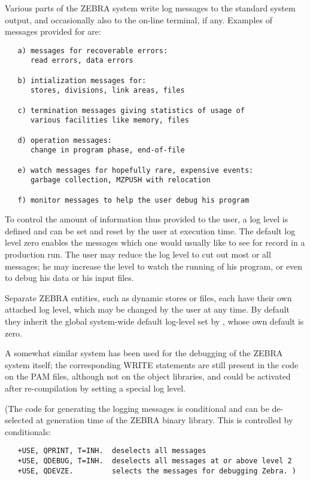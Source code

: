 Various parts of the ZEBRA system write log messages
to the standard system output,
and occasionally also to the on-line terminal, if any.
Examples of messages provided for are:

\begin{verbatim}
   a) messages for recoverable errors:
      read errors, data errors

   b) intialization messages for:
      stores, divisions, link areas, files

   c) termination messages giving statistics of usage of
      various facilities like memory, files

   d) operation messages:
      change in program phase, end-of-file

   e) watch messages for hopefully rare, expensive events:
      garbage collection, MZPUSH with relocation

   f) monitor messages to help the user debug his program
\end{verbatim} 

To control the amount of information thus provided to the user,
a log level is defined and can be set and reset by the user
at execution time.
The default log level zero enables the messages which one would
usually like to see for record in a production run.
The user may reduce the log level to cut out most or all messages;
he may increase the level to watch the running of his program,
or even to debug his data or his input files.

Separate ZEBRA entities, such as dynamic stores or files,
each have their own attached log level,
which may be changed by the user at any time.
By default they inherit the global system-wide default log-level
set by , whose own default is zero.

A somewhat similar system has been used
for the debugging of the ZEBRA system itself;
the corresponding WRITE statements are still present in the code
on the PAM files, although not on the object libraries,
and could be activated after re-compilation
by setting a special log level.

(The code for generating the logging messages is conditional and can
be de-selected at generation time of the ZEBRA binary library.
This is controlled by \PATCHY{} conditionals:
\begin{verbatim}
   +USE, QPRINT, T=INH.  deselects all messages
   +USE, QDEBUG, T=INH.  deselects all messages at or above level 2
   +USE, QDEVZE.         selects the messages for debugging Zebra. )
\end{verbatim} 


